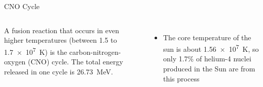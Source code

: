 \documentclass[12pt,compress,aspectratio=169]{beamer}
\begin{document}
\begin{frame}{CNO Cycle}
  \begin{columns}
    A fusion reaction that occurs in even higher temperatures (between 1.5 to
    \SI{1.7e7}{\kelvin}) is the carbon-nitrogen-oxygen (CNO) cycle. The total
    energy released in one cycle is \SI{26.73}{\mega\electronvolt}.
    \begin{itemize}
    \item The core temperature of the sun is about \SI{1.56e7}{\kelvin}, so
      only 1.7\% of helium-4 nuclei produced in the Sun are from this process
    \end{itemize}
  \end{columns}
\end{frame}
\end{document}
